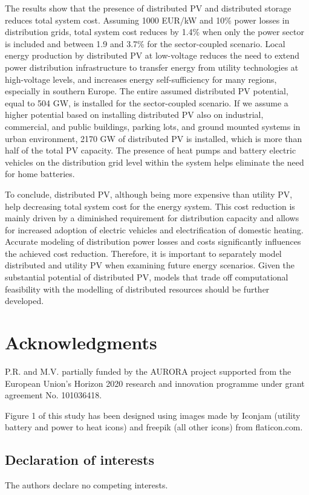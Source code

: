\documentclass[review]{elsarticle}
\begin{document}
	The results show that the presence of distributed PV and distributed storage reduces total system cost. Assuming 1000 EUR/kW and 10\% power losses in distribution grids, total system cost reduces by 1.4\% when only the power sector is included and between 1.9 and 3.7\% for the sector-coupled scenario. Local energy production by distributed PV at low-voltage reduces the need to extend power distribution infrastructure to transfer energy from utility technologies at high-voltage levels, and increases energy self-sufficiency for many regions, especially in southern Europe. The entire assumed distributed PV potential, equal to 504 GW, is installed for the sector-coupled scenario. If we assume a higher potential based on installing distributed PV also on industrial, commercial, and public buildings, parking lots, and ground mounted systems in urban environment, 2170 GW of distributed PV is installed, which is more than half of the total PV capacity. The presence of heat pumps and battery electric vehicles on the distribution grid level within the system helps eliminate the need for home batteries. 
	
	To conclude, distributed PV, although being more expensive than utility PV, help decreasing total system cost for the energy system. This cost reduction is mainly driven by a diminished requirement for distribution capacity and allows for increased adoption of electric vehicles and electrification of domestic heating. Accurate modeling of distribution power losses and costs significantly influences the achieved cost reduction. Therefore, it is important to separately model distributed and utility PV when examining future energy scenarios. Given the substantial potential of distributed PV, models that trade off computational feasibility with the modelling of distributed resources should be further developed.
	
	\section{Acknowledgments}
	P.R. and M.V. partially funded by the AURORA project supported from the European Union’s Horizon 2020 research and innovation programme under grant agreement No. 101036418.
	
	Figure 1 of this study has been designed using images made by Iconjam (utility battery and power to heat icons) and freepik (all other icons) from flaticon.com.
	
	
	\subsection{Declaration of interests}
	The authors declare no competing interests.
	
\end{document}
